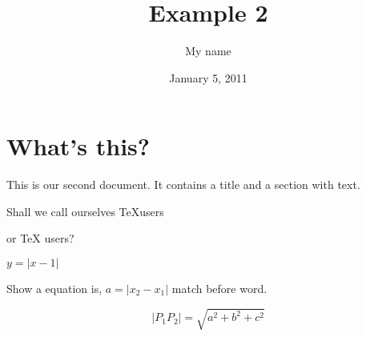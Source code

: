 \documentclass[a4paper,12pt]{article}
\begin{document}
\title{Example 2}
\author{My name}
\date{January 5, 2011}
\maketitle
\section{What's this?}
This is our second document. It contains a title and a section with text.

Shall we call ourselves \TeX users

or \TeX{} users?

$ y = \left| x - 1 \right| $

Show a equation is, $ a = \left| x_2 - x_1 \right| $ match before word.

$$ \left|P_1P_2\right| = \sqrt{a^2 + b^2 + c^2} $$
\end{document}
